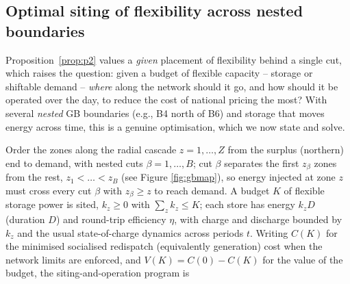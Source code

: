 \documentclass[review,3p,times]{elsarticle}
\theoremstyle{plain}
\theoremstyle{definition}
\begin{document}
\subsection{Optimal siting of flexibility across nested boundaries}
\label{sec:siting}

Proposition~\ref{prop:p2} values a \emph{given} placement of flexibility behind a
single cut, which raises the question: given a budget of flexible
capacity -- storage or shiftable demand -- \emph{where} along the network should it
go, and how should it be operated over the day, to reduce the cost of national
pricing the most? With several \emph{nested} GB boundaries (e.g., B4 north of B6) and
storage that moves energy across time, this is a genuine optimisation, which we
now state and solve.

Order the zones along the radial cascade $z=1,\dots,Z$ from the surplus (northern)
end to demand, with nested cuts $\beta=1,\dots,B$; cut $\beta$ separates the first
$z_\beta$ zones from the rest, $z_1<\dots<z_B$ (see Figure \ref{fig:gbmap}), so energy injected at zone $z$ must
cross every cut $\beta$ with $z_\beta\ge z$ to reach demand. A budget $K$ of
flexible storage power is sited, $k_z\ge0$ with $\sum_z k_z\le K$; each store has
energy $k_z D$ (duration $D$) and round-trip efficiency $\eta$, with charge and
discharge bounded by $k_z$ and the usual state-of-charge dynamics across periods
$t$. Writing $C(K)$ for the minimised socialised redispatch (equivalently
generation) cost when the network limits are enforced, and $V(K)=C(0)-C(K)$ for
the value of the budget, the siting-and-operation program is
\end{document}
